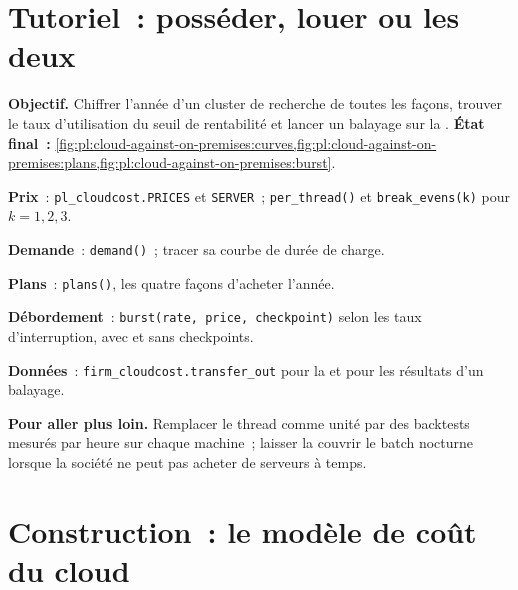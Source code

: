 \section{Tutoriel~: posséder, louer ou les deux}\label{tut:pl:cloud-against-on-premises:tut}

\begin{tutorial}
\textbf{Objectif.} Chiffrer l'année d'un cluster de recherche de toutes les façons, trouver le taux d'utilisation du seuil de rentabilité et lancer un balayage sur la .
\textbf{État final~:} \cref{fig:pl:cloud-against-on-premises:curves,fig:pl:cloud-against-on-premises:plans,fig:pl:cloud-against-on-premises:burst}.
\begin{tutsteps}
\item \textbf{Prix}~: \texttt{pl\_cloudcost.PRICES} et \texttt{SERVER}~; \texttt{per\_thread()} et \texttt{break\_evens(k)} pour
$k=1,2,3$.
\item \textbf{Demande}~: \texttt{demand()}~; tracer sa courbe de durée de charge.
\item \textbf{Plans}~: \texttt{plans()}, les quatre façons d'acheter l'année.
\item \textbf{Débordement}~: \texttt{burst(rate, price, checkpoint)} selon les taux d'interruption, avec et sans checkpoints.
\item \textbf{Données}~: \texttt{firm\_cloudcost.transfer\_out} pour la  et pour les résultats d'un balayage.
\end{tutsteps}
\textbf{Pour aller plus loin.} Remplacer le thread comme unité par des backtests mesurés par heure sur chaque machine~; laisser la  couvrir le
batch nocturne lorsque la société ne peut pas acheter de serveurs à temps.
\end{tutorial}

\section{Construction~: le modèle de coût du cloud}\label{bld:pl:cloud-against-on-premises:cloudcost}


